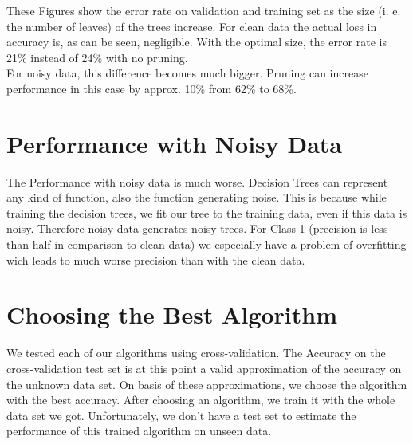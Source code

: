 \documentclass{article}
\begin{document}
These Figures show the error rate on validation and training set as the size (i. e. the number of leaves) of the trees increase.
For clean data the actual loss in accuracy is, as can be seen, negligible. With the optimal size, the error rate is 21\% instead of 24\% with no pruning.\\
For noisy data, this difference becomes much bigger. Pruning can increase performance in this case by approx. 10\% from 62\% to 68\%.

\section{Performance with Noisy Data}
The Performance with noisy data is much worse. Decision Trees can represent any kind of function, also the function generating noise. This is because while training the decision trees, we fit our tree to the training data, even if this data is noisy. Therefore noisy data generates noisy trees.
For Class 1 (precision is less than half in comparison to clean data) we especially have a problem of overfitting wich leads to much worse precision than with the clean data.

\section{Choosing the Best Algorithm}
We tested each of our algorithms using cross-validation. The Accuracy on the cross-validation test set is at this point a valid approximation of the accuracy on the unknown data set. On basis of these approximations, we choose the algorithm with the best accuracy.
After choosing an algorithm, we train it with the whole data set we got. Unfortunately, we don't have a test set to estimate the performance of this trained algorithm on unseen data.



\end{document}
